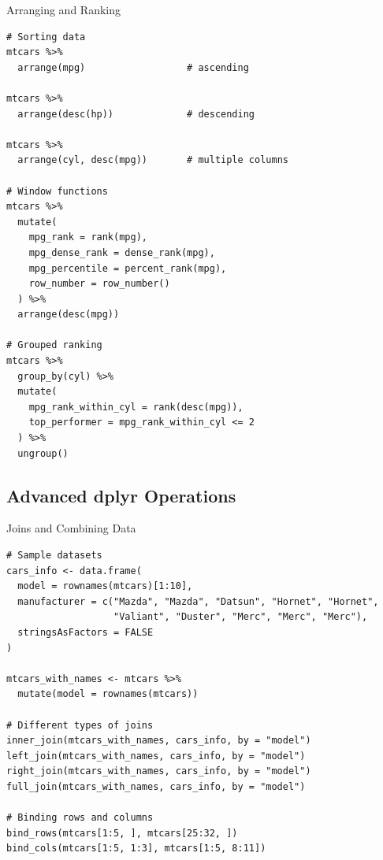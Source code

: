 \documentclass[aspectratio=169]{beamer}
\begin{document}
\begin{frame}[fragile]{Arranging and Ranking}
\begin{lstlisting}
# Sorting data
mtcars %>%
  arrange(mpg)                  # ascending

mtcars %>%
  arrange(desc(hp))             # descending

mtcars %>%
  arrange(cyl, desc(mpg))       # multiple columns

# Window functions
mtcars %>%
  mutate(
    mpg_rank = rank(mpg),
    mpg_dense_rank = dense_rank(mpg),
    mpg_percentile = percent_rank(mpg),
    row_number = row_number()
  ) %>%
  arrange(desc(mpg))

# Grouped ranking
mtcars %>%
  group_by(cyl) %>%
  mutate(
    mpg_rank_within_cyl = rank(desc(mpg)),
    top_performer = mpg_rank_within_cyl <= 2
  ) %>%
  ungroup()
\end{lstlisting}
\end{frame}

\subsection{Advanced dplyr Operations}

\begin{frame}[fragile]{Joins and Combining Data}
\begin{lstlisting}
# Sample datasets
cars_info <- data.frame(
  model = rownames(mtcars)[1:10],
  manufacturer = c("Mazda", "Mazda", "Datsun", "Hornet", "Hornet",
                   "Valiant", "Duster", "Merc", "Merc", "Merc"),
  stringsAsFactors = FALSE
)

mtcars_with_names <- mtcars %>%
  mutate(model = rownames(mtcars))

# Different types of joins
inner_join(mtcars_with_names, cars_info, by = "model")
left_join(mtcars_with_names, cars_info, by = "model")
right_join(mtcars_with_names, cars_info, by = "model")
full_join(mtcars_with_names, cars_info, by = "model")

# Binding rows and columns
bind_rows(mtcars[1:5, ], mtcars[25:32, ])
bind_cols(mtcars[1:5, 1:3], mtcars[1:5, 8:11])
\end{lstlisting}
\end{frame}
\end{document}
